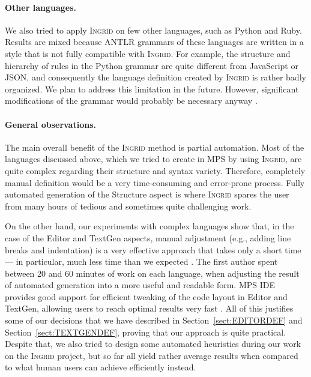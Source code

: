 \paragraph{Other languages.}
We also tried to apply \textsc{Ingrid} on few other languages, such as Python and Ruby.
Results are mixed because ANTLR grammars of these languages are written in a style that is not fully compatible with \textsc{Ingrid}. 
For example, the structure and hierarchy of rules in the Python grammar are quite different from JavaScript or JSON, and consequently the language definition created by \textsc{Ingrid} is rather badly organized.
We plan to address this limitation in the future.
However, significant modifications of the grammar would probably be necessary anyway .

\paragraph{General observations.}
The main overall benefit of the \textsc{Ingrid} method is partial automation.
Most of the languages discussed above, which we tried to create in MPS by using \textsc{Ingrid}, are quite complex regarding their structure and syntax variety.
Therefore, completely manual definition would be a very time-consuming and error-prone process.
Fully automated generation of the Structure aspect is where \textsc{Ingrid} spares the user from many hours of tedious and sometimes quite challenging work.

On the other hand, our experiments with complex languages show that, in the case of the Editor and TextGen aspects, manual adjustment (e.g., adding line breaks and indentation) is a very effective approach that takes only a short time --- in particular, much less time than we expected .
The first author spent between 20 and 60 minutes of work on each language, when adjusting the result of automated generation into a more useful and readable form.
MPS IDE provides good support for efficient tweaking of the code layout in Editor and TextGen, allowing users to reach optimal results very fast .
 All of this justifies some of our decisions that we have described in Section~\ref{sect:EDITORDEF} and Section~\ref{sect:TEXTGENDEF}, proving that our approach is quite practical.
Despite that, we also tried to design some automated heuristics during our work on the \textsc{Ingrid} project, but so far all yield rather average results  when compared to what human users can achieve efficiently instead.

